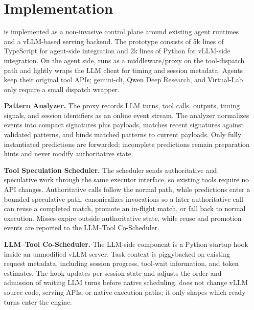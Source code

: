 \section{Implementation}
\label{sec:impl}

\sys is implemented as a non-invasive control plane around existing agent runtimes and a vLLM-based serving backend.
The prototype consists of 5k lines of TypeScript for agent-side integration and 2k lines of Python for vLLM-side integration.
On the agent side, \sys runs as a middleware/proxy on the tool-dispatch path and lightly wraps the LLM client for timing and session metadata.
Agents keep their original tool APIs; gemini-cli, Qwen Deep Research, and Virtual-Lab only require a small dispatch wrapper.

\noindent\textbf{Pattern Analyzer.}
The proxy records LLM turns, tool calls, outputs, timing signals, and session identifiers as an online event stream.
The analyzer normalizes events into compact signatures plus payloads, matches recent signatures against validated patterns, and binds matched patterns to current payloads.
Only fully instantiated predictions are forwarded; incomplete predictions remain preparation hints and never modify authoritative state.

\noindent\textbf{Tool Speculation Scheduler.}
The scheduler sends authoritative and speculative work through the same executor interface, so existing tools require no API changes.
Authoritative calls follow the normal path, while predictions enter a bounded speculative path.
\sys canonicalizes invocations so a later authoritative call can reuse a completed match, promote an in-flight match, or fall back to normal execution.
Misses expire outside authoritative state, while reuse and promotion events are reported to the LLM--Tool Co-Scheduler.

\noindent\textbf{LLM--Tool Co-Scheduler.}
The LLM-side component is a Python startup hook inside an unmodified vLLM server.
Task context is piggybacked on existing request metadata, including session progress, tool-wait information, and token estimates.
The hook updates per-session state and adjusts the order and admission of waiting LLM turns before native scheduling.
\sys does not change vLLM source code, serving APIs, or native execution paths; it only shapes which ready turns enter the engine.
